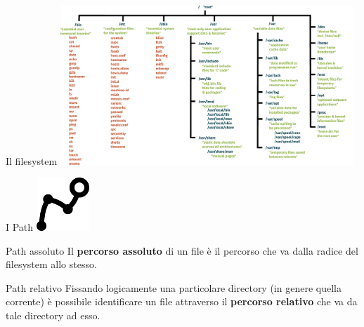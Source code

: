 \documentclass{beamer}
\begin{document}
    \begin{frame}{Il filesystem}
        \centering
        \includegraphics[height=6cm, keepaspectratio]{images/unix-fs.pdf}
    \end{frame}

    \begin{frame}{I Path}
        \centering
        \includegraphics[height=2cm, keepaspectratio]{images/path.pdf}
        \vspace{0.5cm}
        \begin{block}{Path assoluto}
            Il \textbf{percorso assoluto} di un file è il percorso
            che va dalla radice del filesystem allo stesso.
        \end{block}

        \begin{block}{Path relativo}
            Fissando logicamente una particolare directory (in genere quella corrente) è possibile identificare un file attraverso il
            \textbf{percorso relativo} che va da tale directory ad esso.
        \end{block}
    \end{frame}
\end{document}
